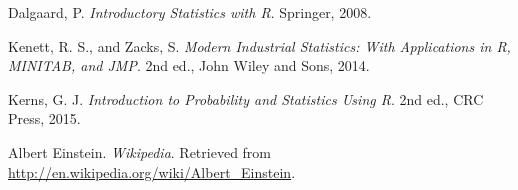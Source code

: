 \newpage

\begin{thebibliography}{99}
    Dalgaard, P.
    \textit{Introductory Statistics with R}.
    Springer, 2008.

    Kenett, R. S., and Zacks, S.
    \textit{Modern Industrial Statistics: With Applications in R, MINITAB, and JMP}.
    2nd ed., John Wiley and Sons, 2014.

    Kerns, G. J.
    \textit{Introduction to Probability and Statistics Using R}.
    2nd ed., CRC Press, 2015.

    Albert Einstein.
    \textit{Wikipedia}. Retrieved from
    \url{http://en.wikipedia.org/wiki/Albert_Einstein}.

\end{thebibliography}
